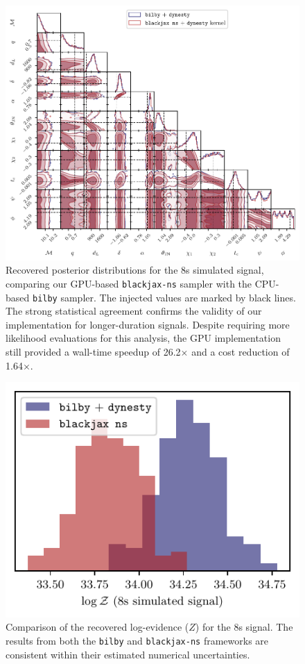 \documentclass[fleqn,usenatbib]{mnras}
\begin{document}
\begin{figure}
    \centering
    \includegraphics{figures/8s_corner_comparison.pdf}
    \caption{Recovered posterior distributions for the 8s simulated
    signal, comparing our GPU-based \texttt{blackjax-ns} sampler
    with the CPU-based \texttt{bilby} sampler. The injected values
    are marked by black lines. The strong statistical agreement confirms
    the validity of our implementation for longer-duration signals.
    Despite requiring more likelihood evaluations for this analysis, the
    GPU implementation still provided a wall-time speedup of
    26.2$\times$ and a cost reduction of 1.64$\times$.}
    \label{fig:8s_posteriors}
\end{figure}

\begin{figure}
    \centering
    \includegraphics{figures/8s_logZ_comparison.pdf}
    \caption{Comparison of the recovered log-evidence ($Z$) for the 8s
    signal. The results from both the \texttt{bilby} and
    \texttt{blackjax-ns} frameworks are consistent within their
    estimated numerical uncertainties.}
    \label{fig:8s_logZ}
\end{figure}
\end{document}
